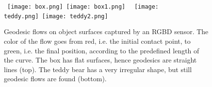 
\begin{figure}[th]
    \centering
    \mbox{
        \texttt{[image: box.png]}
        \texttt{[image: box1.png]}
        }
    \mbox{
        \texttt{[image: teddy.png]}
        \texttt{[image: teddy2.png]}
        }

    \caption{Geodesic flows on object surfaces captured by an RGBD sensor. The color of the flow goes from red, i.e. the initial contact point, to green, i.e. the final position, according to the predefined length of the curve. The box has flat surfaces, hence geodesics are straight lines (top). The teddy bear has a very irregular shape, but still geodesic flows are found (bottom).}
    \label{fig:geodesic_examples}
    \vspace{-0.02\linewidth}
\end{figure}

